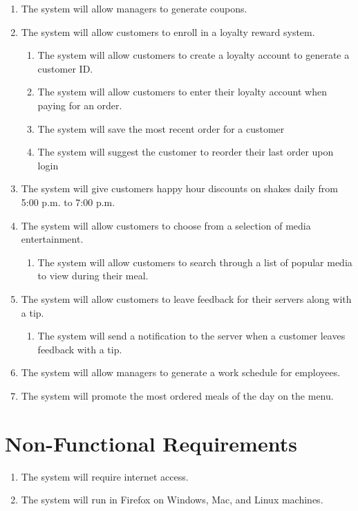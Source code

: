 \documentclass[12pt]{article}
\begin{document}
\begin{enumerate}
			\item The system will allow managers to generate coupons.

			\item The system will allow customers to enroll in a loyalty reward system.
				\begin{enumerate}
					\item The system will allow customers to create a loyalty account to generate a customer ID.
					\item The system will allow customers to enter their loyalty account when paying for an order.
					\item The system will save the most recent order for a customer
					\item The system will suggest the customer to reorder their last order upon login
				\end{enumerate}
				
			\item The system will give customers happy hour discounts on shakes daily from 5:00 p.m. to 7:00 p.m.

			\item The system will allow customers to choose from a selection of media entertainment.
				\begin{enumerate}
					\item The system will allow customers to search through a list of popular media to view during their meal.
				\end{enumerate}

			\item The system will allow customers to leave feedback for their servers along with a tip.
				\begin{enumerate}
					\item The system will send a notification to the server when a customer leaves feedback with a tip.
				\end{enumerate}

			\item The system will allow managers to generate a work schedule for employees.

			\item The system will promote the most ordered meals of the day on the menu.
		\end{enumerate}

	\section{Non-Functional Requirements}
		\begin{enumerate}
			\item The system will require internet access.
			\item The system will run in Firefox on Windows, Mac, and Linux machines.
		\end{enumerate}
\end{document}

